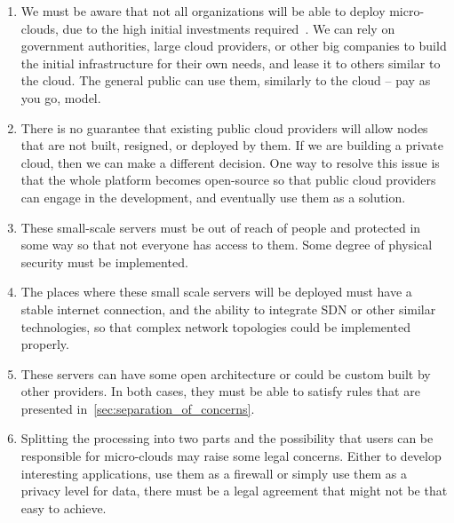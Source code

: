 \begin{enumerate}[start=1,label={(\bfseries \arabic*)}]
	\item We must be aware that not all organizations will be able to deploy micro-clouds, due to the high initial investments required~\cite{MonsalveCC18}. We can rely on government authorities, large cloud providers, or other big companies to build the initial infrastructure for their own needs, and lease it to others similar to the cloud. The general public can use them, similarly to the cloud -- pay as you go, model.
	\item There is no guarantee that existing public cloud providers will allow nodes that are not built, resigned, or deployed by them. If we are building a private cloud, then  we can make a different decision. One way to resolve this issue is that the whole platform becomes open-source so that public cloud providers can engage in the development, and eventually use them as a solution.
	\item These small-scale servers must be out of reach of people and protected in some way so that not everyone has access to them. Some degree of physical security must be implemented.
	\item The places where these small scale servers will be deployed must have a stable internet connection, and the ability to integrate SDN or other similar technologies, so that complex network topologies could be implemented properly.
	\item These servers can have some open architecture or could be custom built by other providers. In both cases, they must be able to satisfy rules that are presented in~\ref{sec:separation_of_concerns}.
	\item Splitting the processing into two parts and the possibility that users can be responsible for micro-clouds may raise some legal concerns. Either to develop interesting applications, use them as a firewall or simply use them as a privacy level for data, there must be a legal agreement that might not be that easy to achieve.
\end{enumerate}
%
%
